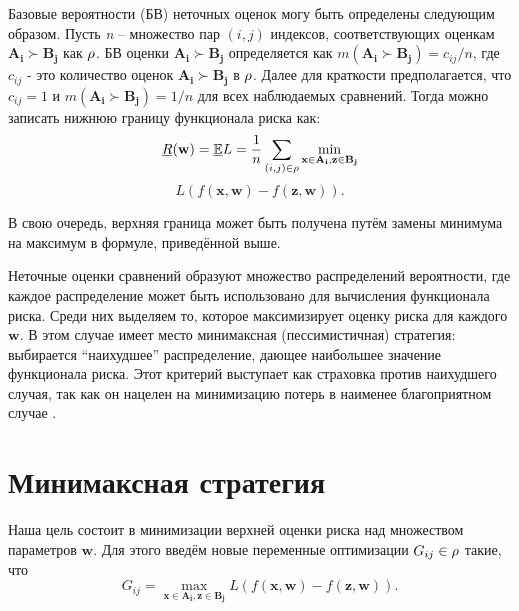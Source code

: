 \documentclass[12pt,a4paper,oneside]{article}
\begin{document}
\begin{multicols}{2}
\par
Базовые вероятности (БВ) неточных оценок могу быть определены следующим образом. 
Пусть \emph{n} -- множество пар \((i, j)\) индексов, соответствующих оценкам \(\mathbf{A_i} \succ \mathbf{B_j}\) как \(\mathrm{\rho}\). 
БВ оценки \(\mathbf{A_i} \succ \mathbf{B_j}\) определяется как \(m(\mathbf{A_i} \succ \mathbf{B_j}) = c_{ij} / n\), где \(c_{ij}\) - это количество оценок \(\mathbf{A_i} \succ \mathbf{B_j}\) в \(\mathrm{\rho}\). 
Далее для краткости предполагается, что \(c_{ij} = 1\) и \(m(\mathbf{A_i} \succ \mathbf{B_j}) = 1/n\) для всех наблюдаемых сравнений. 
Тогда можно записать нижнюю границу функционала риска как:
\[
\underline{R}(\mathbf{w}) = \mathbb{\underline{E}}L = \frac{1}{n} \sum \limits_{(i,j) \in \Rho} \underset{%
\mathbf{x} \in \mathbf{A_i}, \mathbf{z} \in \mathbf{B_j}%
}{\operatorname{min}}\]
\[
L(f(\mathbf{x}, \mathbf{w}) - f(\mathbf{z}, \mathbf{w})).
\]

\par
В свою очередь, верхняя граница может быть получена путём замены минимума на максимум в формуле, приведённой выше.

\par
Неточные оценки сравнений образуют множество распределений вероятности, где каждое распределение может быть использовано для вычисления функционала риска.
Среди них выделяем то, которое максимизирует оценку риска для каждого \(\mathbf{w}\).
В этом случае имеет место минимаксная (пессимистичная) стратегия: выбирается ``наихудшее'' распределение, дающее наибольшее значение функционала риска. 
Этот критерий выступает как страховка против наихудшего случая, так как он нацелен на минимизацию потерь в наименее благоприятном случае . 


\vspace*{1em}
\chapter{Минимаксная стратегия}

\par
Наша цель состоит в минимизации верхней оценки риска над множеством параметров \(\mathbf{w}\). 
Для этого введём новые переменные оптимизации \(G_{ij} \in \mathrm{\rho}\) такие, что
\[
G_{ij} = \underset{\mathbf{x} \in \mathbf{A_i}, \mathbf{z} \in \mathbf{B_j}}{\operatorname{max}} L (f (\mathbf{x}, \mathbf{w}) - f(\mathbf{z}, \mathbf{w})). 
\]


\end{multicols}
\end{document}
